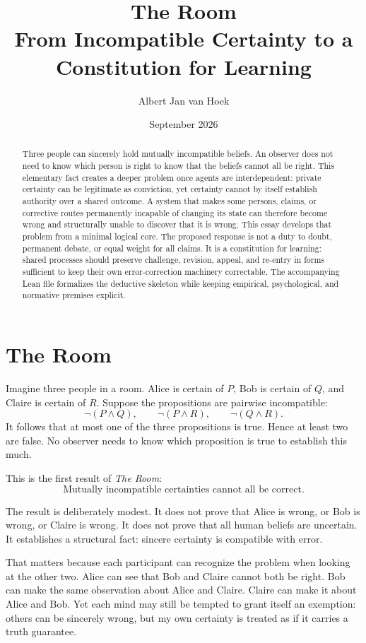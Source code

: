 \documentclass[11pt,a4paper]{article}
\title{\textbf{The Room}\\\large From Incompatible Certainty to a Constitution for Learning}
\author{Albert Jan van Hoek}
\date{September 2026}
\begin{document}
\maketitle

\begin{abstract}
Three people can sincerely hold mutually incompatible beliefs. An observer does not need to know which person is right to know that the beliefs cannot all be right. This elementary fact creates a deeper problem once agents are interdependent: private certainty can be legitimate as conviction, yet certainty cannot by itself establish authority over a shared outcome. A system that makes some persons, claims, or corrective routes permanently incapable of changing its state can therefore become wrong and structurally unable to discover that it is wrong. This essay develops that problem from a minimal logical core. The proposed response is not a duty to doubt, permanent debate, or equal weight for all claims. It is a constitution for learning: shared processes should preserve challenge, revision, appeal, and re-entry in forms sufficient to keep their own error-correction machinery correctable. The accompanying Lean file formalizes the deductive skeleton while keeping empirical, psychological, and normative premises explicit.
\end{abstract}

\section{The Room}

Imagine three people in a room. Alice is certain of $P$, Bob is certain of $Q$, and Claire is certain of $R$. Suppose the propositions are pairwise incompatible:
\[
\neg(P\land Q),\qquad \neg(P\land R),\qquad \neg(Q\land R).
\]
It follows that at most one of the three propositions is true. Hence at least two are false. No observer needs to know which proposition is true to establish this much.

This is the first result of \emph{The Room}:
\[
\boxed{\text{Mutually incompatible certainties cannot all be correct.}}
\]

The result is deliberately modest. It does not prove that Alice is wrong, or Bob is wrong, or Claire is wrong. It does not prove that all human beliefs are uncertain. It establishes a structural fact: sincere certainty is compatible with error.

That matters because each participant can recognize the problem when looking at the other two. Alice can see that Bob and Claire cannot both be right. Bob can make the same observation about Alice and Claire. Claire can make it about Alice and Bob. Yet each mind may still be tempted to grant itself an exemption: others can be sincerely wrong, but my own certainty is treated as if it carries a truth guarantee.
\end{document}
